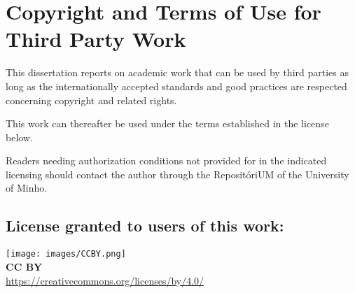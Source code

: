 \chapter*{Copyright and Terms of Use for Third Party Work}
\setlength{\parskip}{1em}
\noindent
This dissertation reports on academic work that can be used by third parties as long as the internationally accepted standards and good practices are respected concerning copyright and related rights.

\noindent
This work can thereafter be used under the terms established in the license below.

\noindent
Readers needing authorization conditions not provided for in the indicated licensing should contact the author through the RepositóriUM of the University of Minho.

\section*{License granted to users of this work:}


\noindent
\texttt{[image: images/CCBY.png]}
\\
\textbf{CC BY}
\\
\url{https://creativecommons.org/licenses/by/4.0/}



